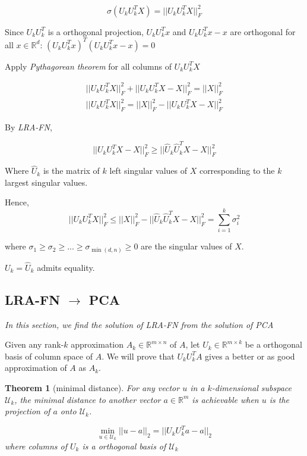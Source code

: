 \documentclass{article}
\newtheorem{theorem}{Theorem}
\begin{document}
\begin{equation}
    \sigma(U_k U_k^T X) = ||U_k U_k^T X||_F^2
\end{equation}

Since $U_k U_k^T$ is a orthogonal projection, $U_k U_k^T x$ and $U_k U_k^T x - x$ are orthogonal for all $x \in \mathbb{R}^d$: $(U_k U_k^T x)^T (U_k U_k^T x - x) = 0$

Apply \emph{Pythagorean theorem} for all columns of $U_k U_k^T X$

\begin{equation}
    \begin{split}
    ||U_k U_k^T X||_F^2 + ||U_k U_k^T X - X||_F^2 = ||X||_F^2 \\ 
    ||U_k U_k^T X||_F^2 = ||X||_F^2 - ||U_k U_k^T X - X||_F^2 
    \end{split}
\end{equation}

By \emph{LRA-FN}, 

\begin{equation}
    ||U_k U_k^T X - X||_F^2 \geq ||\hat{U}_k \hat{U}_k^T X - X||_F^2   
\end{equation}

Where $\hat{U}_k$ is the matrix of $k$ left singular values of $X$ corresponding to the $k$ largest singular values.

Hence,
\begin{equation}
    ||U_k U_k^T X||_F^2 \leq ||X||_F^2 - ||\hat{U}_k \hat{U}_k^T X - X||_F^2 = \sum_{i=1}^k \sigma_i^2
\end{equation}

where $\sigma_1 \geq \sigma_2 \geq ... \geq \sigma_{\min(d, n)} \geq 0$ are the singular values of $X$.

$U_k = \hat{U}_k$ admits equality.

\subsection{LRA-FN $\to$ PCA}

\emph{In this section, we find the solution of LRA-FN from the solution of PCA}

Given any rank-$k$ approximation $A_k \in \mathbb{R}^{m \times n}$ of $A$, let $U_k \in \mathbb{R}^{m \times k}$ be a orthogonal basis of column space of $A$. We will prove that $U_k U_k^T A$ gives a better or as good approximation of $A$ as $A_k$.

\begin{theorem}[minimal distance]
\label{theo:minimal_distance}
For any vector $u$ in a $k$-dimensional subspace $\mathcal{U}_k$, the minimal distance to another vector $a \in \mathbb{R}^m$ is achievable when $u$ is the projection of $a$ onto $\mathcal{U}_k$.

\begin{equation}
    \min_{u \in \mathcal{U}_k} ||u - a||_2 = ||U_k U_k^T a - a||_2
\end{equation}
where columns of $U_k$ is a orthogonal basis of $\mathcal{U}_k$
\end{theorem}
\end{document}
